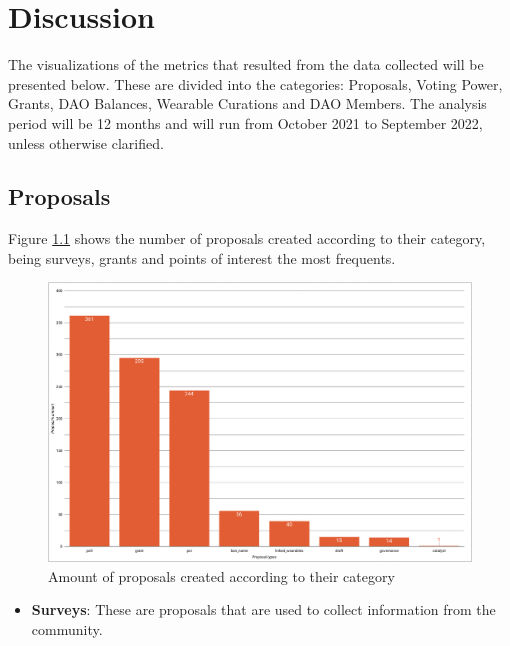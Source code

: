 \documentclass[MSE,Master,english]{twbook}%
\begin{document}
\chapter{Discussion\label{discussion}}
The visualizations of the metrics that resulted from the data collected will be presented below. These are divided into the categories: Proposals, Voting Power, Grants, DAO Balances, Wearable Curations and DAO Members. The analysis period will be 12 months and will run from October 2021 to September 2022, unless otherwise clarified.

\section{Proposals}
Figure \ref{fig:proposal_types} shows the number of proposals created according to their category, being surveys, grants and points of interest the most frequents.
\begin{figure}[H]
  \centering
  \includegraphics[width=\textwidth]{metrics/proposal_types.png}
  \caption{Amount of proposals created according to their category}
  \label{fig:proposal_types}
\end{figure}

\begin{itemize}
  \item \textbf{Surveys}: These are proposals that are used to collect information from the community.
\end{itemize}
\end{document}

